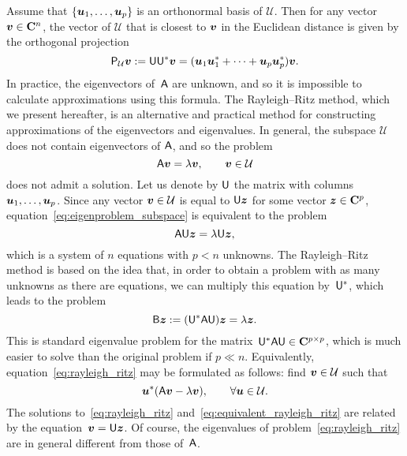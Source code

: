 Assume that $\{\mathbf{\boldsymbol{u}}_1, \dotsc, \mathbf{\boldsymbol{u}}_p\}$ is an orthonormal basis of $\mathcal U$.
Then for any vector $\mathbf{\boldsymbol{v}} \in \mathbf C^{n}$,
the vector of $\mathcal U$ that is closest to $\mathbf{\boldsymbol{v}}$ in the Euclidean distance is given by the orthogonal projection
\[
    \mathsf P_{\mathcal U} \mathbf{\boldsymbol{v}} := \mathsf U \mathsf U^* \mathbf{\boldsymbol{v}} = (\mathbf{\boldsymbol{u}}_1 \mathbf{\boldsymbol{u}}_1^* + \dotsb + \mathbf{\boldsymbol{u}}_p \mathbf{\boldsymbol{u}}_p^*) \mathbf{\boldsymbol{v}}.
\]
In practice,
the eigenvectors of~$\mathsf A$ are unknown,
and so it is impossible to calculate approximations using this formula.
The Rayleigh--Ritz method,
which we present hereafter,
is an alternative and practical method for constructing approximations of the eigenvectors and eigenvalues.
In general, the subspace $\mathcal U$ does not contain eigenvectors of $\mathsf A$,
and so the problem
\begin{equation}
    \label{eq:eigenproblem_subspace}
    \mathsf A \mathbf{\boldsymbol{v}} = \lambda \mathbf{\boldsymbol{v}}, \qquad \mathbf{\boldsymbol{v}} \in \mathcal U
\end{equation}
does not admit a solution.
Let us denote by $\mathsf U$ the matrix with columns~$\mathbf{\boldsymbol{u}}_1, \dotsc, \mathbf{\boldsymbol{u}}_p$.
Since any vector $\mathbf{\boldsymbol{v}} \in \mathcal U$ is equal to $\mathsf U \mathbf{\boldsymbol{z}}$ for some vector $\mathbf{\boldsymbol{z}} \in \mathbf C^p$,
equation~\eqref{eq:eigenproblem_subspace} is equivalent to the problem
\[
    \mathsf A \mathsf U \mathbf{\boldsymbol{z}} = \lambda \mathsf U \mathbf{\boldsymbol{z}},
\]
which is a system of $n$ equations with $p < n$ unknowns.
The Rayleigh--Ritz method is based on the idea that,
in order to obtain a problem with as many unknowns as there are equations,
we can multiply this equation by~$\mathsf U^*$,
which leads to the problem
\begin{equation}
    \label{eq:rayleigh_ritz}
    \mathsf B \mathbf{\boldsymbol{z}} := (\mathsf U^* \mathsf A \mathsf U) \mathbf{\boldsymbol{z}} = \lambda \mathbf{\boldsymbol{z}}.
\end{equation}
This is standard eigenvalue problem for the matrix~$\mathsf U^* \mathsf A \mathsf U \in \mathbf C^{p \times p}$,
which is much easier to solve than the original problem if $p \ll n$.
Equivalently, equation~\eqref{eq:rayleigh_ritz} may be formulated as follows: find $\mathbf{\boldsymbol{v}} \in \mathcal U$
such that
\begin{equation}
    \label{eq:equivalent_rayleigh_ritz}
    \mathbf{\boldsymbol{u}}^* (\mathsf A \mathbf{\boldsymbol{v}} - \lambda \mathbf{\boldsymbol{v}}), \qquad \forall \mathbf{\boldsymbol{u}} \in \mathcal U.
\end{equation}
The solutions to~\eqref{eq:rayleigh_ritz} and~\eqref{eq:equivalent_rayleigh_ritz} are related by the equation~$\mathbf{\boldsymbol{v}} = \mathsf U \mathbf{\boldsymbol{z}}$.
Of course, the eigenvalues of problem~\eqref{eq:rayleigh_ritz} are in general different from those of~$\mathsf A$.
